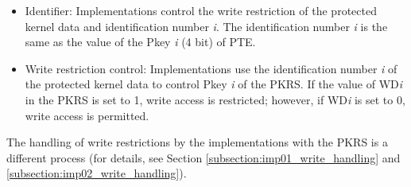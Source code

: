 \begin{itemize}
\item Identifier: Implementations control the write restriction of the protected
kernel data and identification number {\it i}.
The identification number {\it i} is the same as the value of the Pkey {\it i} (4
bit) of PTE.


\item Write restriction control: Implementations use the identification number
{\it i} of the protected kernel data to control Pkey {\it i} of the PKRS.
%
If the value of WD{\it i} in the PKRS is set to 1, write access is restricted;
however, if WD{\it i} is set to 0, write access is permitted.
    
\end{itemize}

The handling of write restrictions by the implementations with the PKRS is a
different process (for details, see Section
\ref{subsection:imp01_write_handling} and
\ref{subsection:imp02_write_handling}).

%



